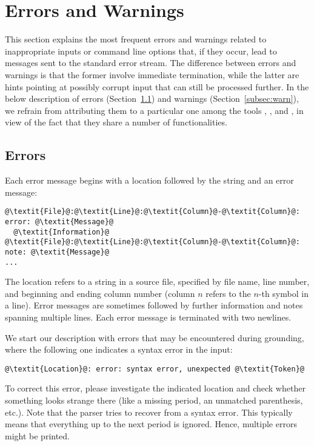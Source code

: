 \section{Errors and Warnings}\label{sec:error:warn}

This section explains the most frequent errors and warnings
related to inappropriate inputs or command line options that,
if they occur, lead to messages sent to the standard error stream.
The difference between errors and warnings is that the former
involve immediate termination,
while the latter are hints pointing at possibly corrupt input
that can still be processed further.
In the below description of errors (Section~\ref{subsec:error})
and warnings (Section~\ref{subsec:warn}),
we refrain from attributing them to a particular one among the tools
\gringo, \clasp, and \clingo,
in view of the fact that they share a number of functionalities.


\subsection{Errors}\label{subsec:error}

Each error message begins with a location followed by the string  and an error message:
\begin{lstlisting}[numbers=none,escapechar=@]
@\textit{File}@:@\textit{Line}@:@\textit{Column}@-@\textit{Column}@: error: @\textit{Message}@
  @\textit{Information}@
@\textit{File}@:@\textit{Line}@:@\textit{Column}@-@\textit{Column}@: note: @\textit{Message}@
...

\end{lstlisting}
The location refers to a string in a source file, specified by file name, line number, and beginning and ending column number
(column $n$ refers to the $n$-th symbol in a line).
Error messages are sometimes followed by further information and notes spanning multiple lines.
Each error message is terminated with two newlines.

We start our description with errors that may be encountered during grounding,
where the following one indicates a syntax error in the input:
%
\begin{lstlisting}[numbers=none,escapechar=@]
@\textit{Location}@: error: syntax error, unexpected @\textit{Token}@
\end{lstlisting}
%
To correct this error, please investigate the indicated location
and check whether something looks strange there
(like a missing period, an unmatched parenthesis, etc.).
Note that the parser tries to recover from a syntax error.
This typically means that everything up to the next period is ignored.
Hence, multiple errors might be printed.

